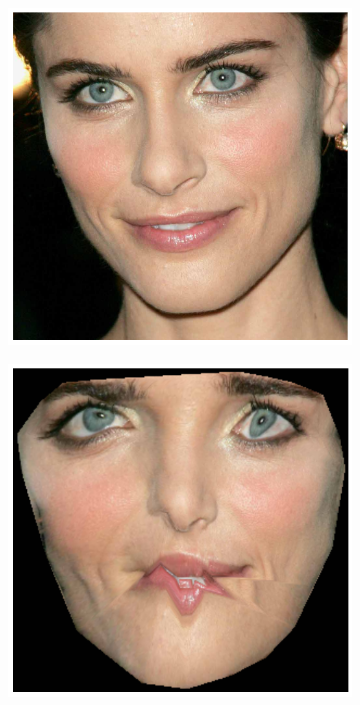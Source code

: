 \begin{figure}[h!]
\begin{subfigure}[b]{0.1\textwidth}
    \end{subfigure}
    \hfill
    \begin{subfigure}[b]{0.12\textwidth}
            \includegraphics[width=\textwidth]{resources/Fig_Draw/test_04_base}
    \end{subfigure}
   	\hfill
    \begin{subfigure}[b]{0.1\textwidth}
            \includegraphics[width=\textwidth]{resources/Fig_Draw/test_04_aam}

\end{subfigure}
\end{figure}
